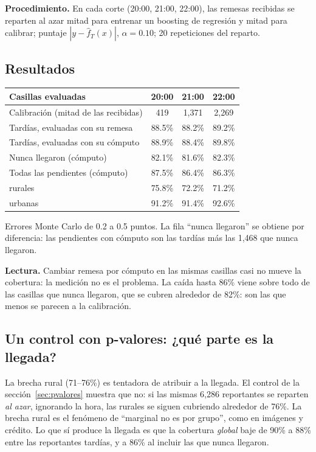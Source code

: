 \documentclass[11pt]{article}
\theoremstyle{plain}
\theoremstyle{definition}
\theoremstyle{remark}
\newcommand{\fhat}{\widehat f_T}
\newcommand{\dest}[1]{\par\needspace{4\baselineskip}\textbf{#1}\quad}
\begin{document}
\dest{Procedimiento.} En cada corte (20:00, 21:00, 22:00), las remesas recibidas se reparten al azar
mitad para entrenar un boosting de regresión y mitad para calibrar; puntaje $|y-\fhat(x)|$,
$\alpha=0.10$; 20 repeticiones del reparto.

\subsection{Resultados}
\begin{center}
\begin{tabular}{lccc}
\toprule
Casillas evaluadas & 20:00 & 21:00 & 22:00\\
\midrule
Calibración (mitad de las recibidas) & 419 & 1,371 & 2,269\\
\midrule
Tardías, evaluadas con su remesa & 88.5\% & 88.2\% & 89.2\%\\
Tardías, evaluadas con su cómputo & 88.9\% & 88.4\% & 89.8\%\\
Nunca llegaron (cómputo) & 82.1\% & 81.6\% & 82.3\%\\
Todas las pendientes (cómputo) & 87.5\% & 86.4\% & 86.3\%\\
\quad rurales & 75.8\% & 72.2\% & 71.2\%\\
\quad urbanas & 91.2\% & 91.4\% & 92.6\%\\
\bottomrule
\end{tabular}
\end{center}
Errores Monte Carlo de 0.2 a 0.5 puntos. La fila ``nunca llegaron'' se obtiene por diferencia: las
pendientes con cómputo son las tardías más las 1,468 que nunca llegaron.

\dest{Lectura.} Cambiar remesa por cómputo en las mismas casillas casi no mueve la cobertura: la
medición no es el problema. La caída hasta 86\% viene sobre todo de las casillas que nunca llegaron,
que se cubren alrededor de 82\%: son las que menos se parecen a la calibración.

\subsection{Un control con p-valores: ¿qué parte es la llegada?}
La brecha rural (71--76\%) es tentadora de atribuir a la llegada. El control de la
sección~\ref{sec:pvalores} muestra que no: si las mismas 6,286 reportantes se reparten \emph{al azar},
ignorando la hora, las rurales se siguen cubriendo alrededor de 76\%. La brecha rural es el fenómeno
de ``marginal no es por grupo'', como en imágenes y crédito. Lo que sí produce la llegada es que la
cobertura \emph{global} baje de 90\% a 88\% entre las reportantes tardías, y a 86\% al incluir las
que nunca llegaron.
\end{document}
